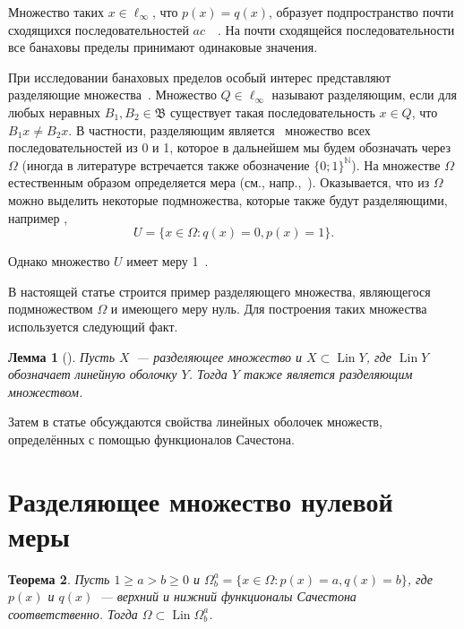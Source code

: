 \documentclass[a4paper,14pt]{article} %
\theoremstyle{plain}
\newtheorem{lemma}{Лемма}[section]
\newtheorem{theorem}[lemma]{Теорема}
\begin{document}
Множество таких $x\in\ell_\infty$, что $p(x)=q(x)$,
образует подпространство почти сходящихся последовательностей $ac$~~\cite{lorentz1948contribution}.
На почти сходящейся последовательности все банаховы пределы принимают одинаковые значения.

При исследовании банаховых пределов особый интерес представляют разделяющие множества~\cite[\S 3]{Semenov2014geomprops}.
Множество $Q\in\ell_\infty$ называют разделяющим, если
для любых неравных $B_1, B_2\in\mathfrak{B}$ существует такая последовательность $x\in Q$,
что $B_1 x \neq B_2 x$.
В частности, разделяющим является~\cite{semenov2010characteristic} множество всех последовательностей из 0 и 1,
которое в дальнейшем мы будем обозначать через $\Omega$
(иногда в литературе встречается также обозначение $\{0;1\}^\mathbb{N}$).
На множестве $\Omega$ естественным образом определяется мера (см., напр.,~\cite{connor1990almost}).
Оказывается, что из $\Omega$ можно выделить некоторые подмножества, которые также будут разделяющими,
например \cite[\S 3, Теорема 11]{Semenov2014geomprops},
\begin{equation}
	U = \{ x\in\Omega: q(x) = 0, p(x) = 1 \}
	.
\end{equation}

Однако множество $U$ имеет меру 1~\cite{semenov2010characteristic}.

В настоящей статье строится пример разделяющего множества,
являющегося подмножеством $\Omega$ и имеющего меру нуль.
Для построения таких множества используется следующий факт.

\begin{lemma}[{\cite[\S 3, замечание 6]{Semenov2014geomprops}}]
	Пусть $X$~--- разделяющее множество и $X \subset \operatorname{Lin} Y$,
	где $\operatorname{Lin} Y$ обозначает линейную оболочку $Y$.
	Тогда $Y$ также является разделяющим множеством.
\end{lemma}
Затем в статье обсуждаются свойства линейных оболочек множеств, определённых с помощью функционалов Сачестона.

\section{Разделяющее множество нулевой меры}

\begin{theorem}
	\label{thm:Lin_Omega_Sucheston}
	Пусть
	$1 \geq a > b \geq 0$ и
	$\Omega^a_b = \{x\in\Omega : p(x) = a, q(x) = b\}$,
	где $p(x)$ и $q(x)$~--- верхний и нижний функционалы Сачестона~\cite{sucheston1967banach} соответственно.
	Тогда $\Omega \subset \operatorname{Lin} \Omega^a_b$.
\end{theorem}
\end{document}
